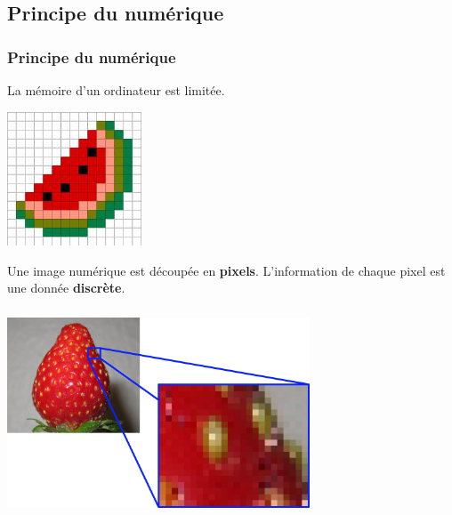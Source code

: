 \documentclass[svgnames,11pt]{beamer}
\begin{document}
\subsection{Principe du numérique}
\begin{frame}
    \frametitle{Principe du numérique}
    La mémoire d'un ordinateur est limitée.
    \begin{center}
        \centering
        \includegraphics[width=4cm]{ressources/pasteque.jpg}
        \label{IMG}
    \end{center}
    \begin{aretenir}[]
        Une image numérique est découpée en \textbf{pixels}. L'information de chaque pixel est une donnée \textbf{discrète}.
    \end{aretenir}
\end{frame}
\begin{frame}
    \frametitle{}

    \begin{center}
        \centering
        \includegraphics[width=9cm]{ressources/fraise.png}
        \label{IMG}
    \end{center}

\end{frame}
\end{document}
